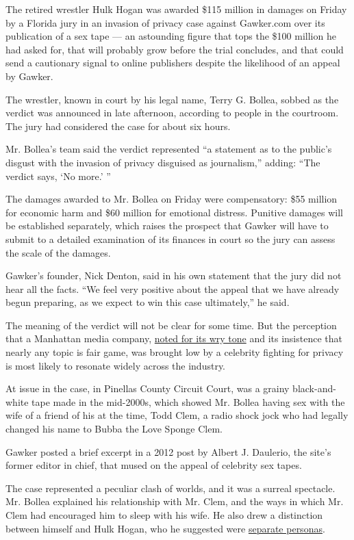 The retired wrestler Hulk Hogan was awarded \$115 million in damages on
Friday by a Florida jury in an invasion of privacy case against
Gawker.com over its publication of a sex tape --- an astounding figure
that tops the \$100 million he had asked for, that will probably grow
before the trial concludes, and that could send a cautionary signal to
online publishers despite the likelihood of an appeal by Gawker.

The wrestler, known in court by his legal name, Terry G. Bollea, sobbed
as the verdict was announced in late afternoon, according to people in
the courtroom. The jury had considered the case for about six hours.

Mr. Bollea's team said the verdict represented ``a statement as to the
public's disgust with the invasion of privacy disguised as journalism,''
adding: ``The verdict says, `No more.' ''

The damages awarded to Mr. Bollea on Friday were compensatory: \$55
million for economic harm and \$60 million for emotional distress.
Punitive damages will be established separately, which raises the
prospect that Gawker will have to submit to a detailed examination of
its finances in court so the jury can assess the scale of the damages.

Gawker's founder, Nick Denton, said in his own statement that the jury
did not hear all the facts. ``We feel very positive about the appeal
that we have already begun preparing, as we expect to win this case
ultimately,'' he said.

The meaning of the verdict will not be clear for some time. But the
perception that a Manhattan media company,
\href{http://www.nytimes3xbfgragh.onion/2015/06/14/business/media/gawker-nick-denton-moment-of-truth.html}{noted
for its wry tone} and its insistence that nearly any topic is fair game,
was brought low by a celebrity fighting for privacy is most likely to
resonate widely across the industry.

At issue in the case, in Pinellas County Circuit Court, was a grainy
black-and-white tape made in the mid-2000s, which showed Mr. Bollea
having sex with the wife of a friend of his at the time, Todd Clem, a
radio shock jock who had legally changed his name to Bubba the Love
Sponge Clem.

Gawker posted a brief excerpt in a 2012 post by Albert J. Daulerio, the
site's former editor in chief, that mused on the appeal of celebrity sex
tapes.

The case represented a peculiar clash of worlds, and it was a surreal
spectacle. Mr. Bollea explained his relationship with Mr. Clem, and the
ways in which Mr. Clem had encouraged him to sleep with his wife. He
also drew a distinction between himself and Hulk Hogan, who he suggested
were
\href{http://www.nytimes3xbfgragh.onion/2016/03/09/business/media/when-is-hulk-hogan-not-hulk-hogan.html}{separate
personas}.

